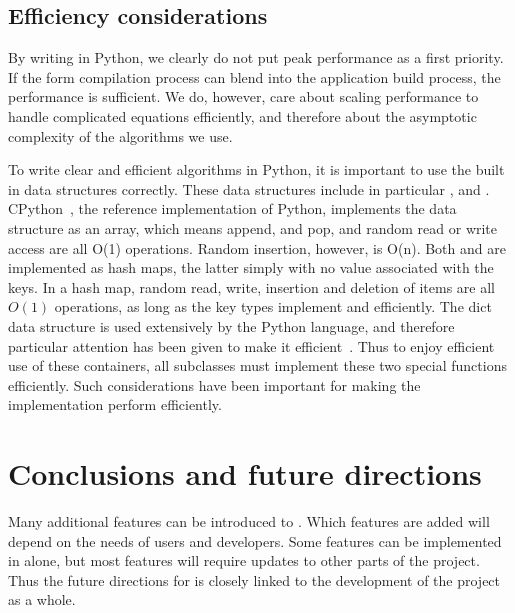 \subsection{Efficiency considerations}

By writing \ufl{} in Python, we clearly do not put peak performance as
a first priority. If the form compilation process can blend into the
application build process, the performance is sufficient.  We do,
however, care about scaling performance to handle complicated
equations efficiently, and therefore about the asymptotic complexity
of the algorithms we use.

To write clear and efficient algorithms in Python, it is important to
use the built in data structures correctly.  These data structures
include in particular ,  and .
CPython~\cite{Rossumothers}, the reference implementation of Python,
implements the data structure  as an array, which means
append, and pop, and random read or write access are all O(1)
operations.  Random insertion, however, is O(n).  Both 
and  are implemented as hash maps, the latter simply with
no value associated with the keys. In a hash map, random read, write,
insertion and deletion of items are all $O(1)$ operations, as long as
the key types implement  and 
efficiently. The dict data structure is used extensively by the Python
language, and therefore particular attention has been given to make it
efficient~\cite{Kuc2007}.  Thus to enjoy efficient use of these
containers, all  subclasses must implement these two
special functions efficiently. Such considerations have been important
for making the \ufl{} implementation perform efficiently.

\section{Conclusions and future directions} \label{ufl:sec:future}
Many additional features can be introduced to \ufl{}.
Which features are added will depend on the needs of \fenics{} users
and developers.  Some features can be implemented in \ufl{} alone,
but most features will require updates to other parts of the
\fenics{} project. Thus the future directions for \ufl{} is closely
linked to the development of the \fenics{} project as a whole.

